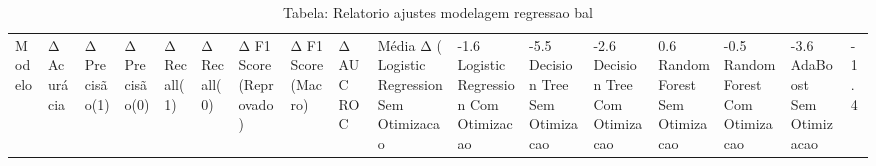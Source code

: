 \begin{table}[H] %
    \centering
    \caption{Tabela: Relatorio ajustes modelagem regressao bal}
    \label{tab:relatorio_ajustes_modelagem_regressao_bal}
    \renewcommand{\arraystretch}{1.25} %
    \begin{adjustwidth}{ -1in }{ -1in } %
    \centering %
    \small %
    \begin{tabular}{lllllllllll}
\toprule
                            Modelo & Δ Acurácia & Δ Precisão(1) & Δ Precisão(0) & Δ Recall(1) & Δ Recall(0) & Δ F1 Score (Reprovado) & Δ F1 Score (Macro) & Δ AUC ROC & Média Δ (%
\midrule
Logistic Regression Sem Otimizacao &      -1.6%
Logistic Regression Com Otimizacao &      -5.5%
      Decision Tree Sem Otimizacao &      -2.6%
      Decision Tree Com Otimizacao &       0.6%
      Random Forest Sem Otimizacao &      -0.5%
      Random Forest Com Otimizacao &      -3.6%
           AdaBoost Sem Otimizacao &      -1.4%

\end{tabular}
\end{adjustwidth}
\end{table}
